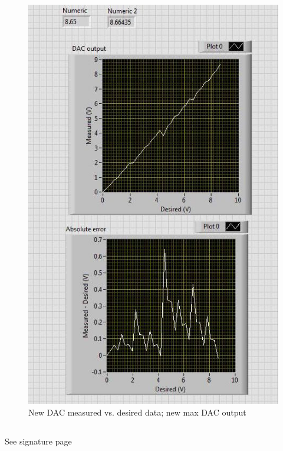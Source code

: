 \documentclass{article}
\begin{document}
    \begin{figure}[H]
        \centering
        \includegraphics[scale = 0.5]{4d.jpeg}
        \caption{New DAC measured vs. desired data; new max DAC output \cite{lab10}}
        \label{fig:my_label}
    \end{figure}
    
\subsection{}
    See signature page
    
\end{document}
